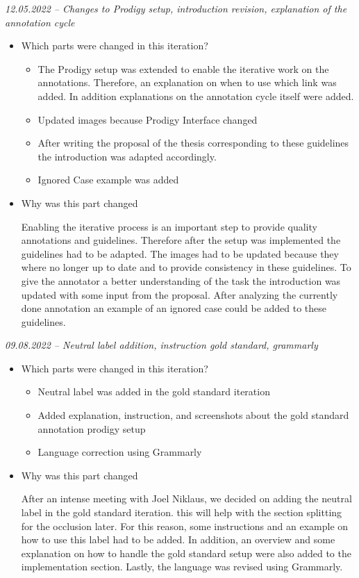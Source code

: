 \documentclass{article}
\begin{document}
\begin{mdframed}
\emph{12.05.2022 – Changes to Prodigy setup, introduction revision, explanation of the annotation cycle }
\begin{itemize}
	\item Which parts were changed in this iteration? 
	\begin{itemize}
	    \item The Prodigy setup was extended to enable the iterative work on the annotations. Therefore, an explanation on when to use which link was added. In addition explanations on the annotation cycle itself were added.
	    \item Updated images because Prodigy Interface changed
	    \item After writing the proposal of the thesis corresponding to these guidelines the introduction was adapted accordingly.
	    \item Ignored Case example was added
	\end{itemize} 
    \item Why was this part changed
    
    Enabling the iterative process is an important step to provide quality annotations and guidelines. Therefore after the setup was implemented the guidelines had to be adapted. The images had to be updated because they where no longer up to date and to provide consistency in these guidelines. To give the annotator a better understanding of the task the introduction was updated with some input from the proposal. After analyzing the currently done annotation an example of an ignored case could be added to these guidelines.
    
\end{itemize}
\end{mdframed}
\begin{mdframed}
\emph{09.08.2022 – Neutral label addition, instruction gold standard, grammarly}
\begin{itemize}
	\item Which parts were changed in this iteration? 
	\begin{itemize}
	    \item Neutral label was added in the gold standard iteration
	    \item Added explanation, instruction, and screenshots about the gold standard annotation prodigy setup
	    \item Language correction using Grammarly
	    
	\end{itemize} 
    \item Why was this part changed
    
    After an intense meeting with Joel Niklaus, we decided on adding the neutral label in the gold standard iteration. this will help with the section splitting for the occlusion later. For this reason, some instructions and an example on how to use this label had to be added. In addition, an overview and some explanation on how to handle the gold standard setup were also added to the implementation section. Lastly, the language was revised using Grammarly.
\end{itemize}
\end{mdframed}
\end{document}
